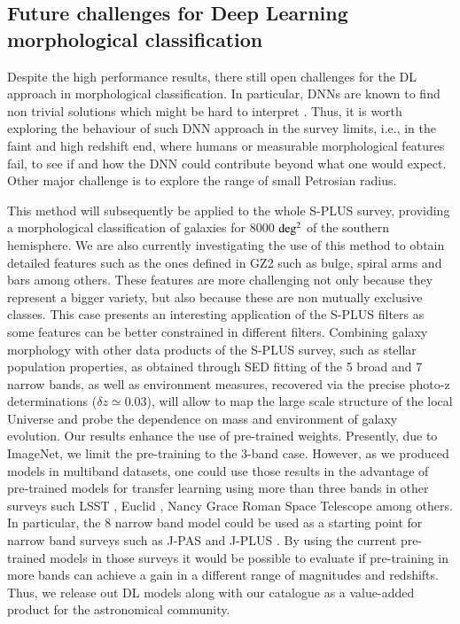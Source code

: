 \documentclass[fleqn,usenatbib]{mnras}
\begin{document}
\subsection{Future challenges for Deep Learning morphological classification}

Despite the high performance results, there still open challenges for the DL approach in morphological classification. In particular, DNNs are known to find non trivial solutions which might be hard to interpret \citep{ribeiro2016model,lundberg2017unified}. Thus, it is worth exploring the behaviour of such DNN approach in the survey limits, i.e., in the faint and high redshift end, where humans or measurable morphological features fail, to see if and how the DNN could contribute beyond what one would expect. Other major challenge is to explore the range of small Petrosian radius.


This method will subsequently be applied to the whole S-PLUS survey, providing a morphological classification of galaxies for 8000 $\rm deg^2$ of the southern hemisphere. We are also currently investigating the use of this method to obtain detailed features such as the ones defined in GZ2 such as bulge, spiral arms and bars among others. These features are  more challenging not only because they represent a bigger variety, but also because these are non mutually exclusive classes. This case presents an interesting application of the S-PLUS filters as some features can be better constrained in different filters. Combining galaxy morphology with other data products of the S-PLUS survey, such as stellar population properties, as obtained through SED fitting of the 5 broad and 7 narrow bands, as well as environment measures, recovered via the precise photo-z determinations ($\delta z \simeq 0.03$), will allow to map the large scale structure of the local Universe and probe the dependence on mass and environment of galaxy evolution.  
Our results enhance the use of pre-trained weights. Presently, due to ImageNet, we limit the pre-training to the 3-band case. However, as we produced models in multiband datasets, one could use those results in the advantage of  pre-trained models for transfer learning using more than three bands in other surveys such LSST \citep{LSST20}, Euclid \citep{EUCLID}, Nancy Grace Roman Space Telescope \citep{WFIRST} among others. In particular, the 8 narrow band model could be used as a starting point for narrow band surveys such as J-PAS \citep{JPAS} and J-PLUS \citep{JPLUS}. By using the current pre-trained models in those surveys it would be possible to evaluate if pre-training in more bands can achieve a gain in a different range of magnitudes and redshifts. Thus, we release out DL models along with our catalogue as a value-added product for the astronomical community.
\end{document}
